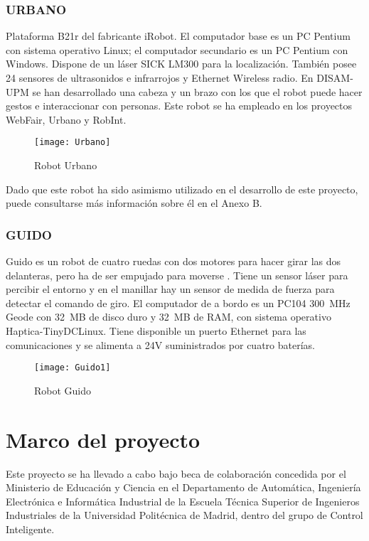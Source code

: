 \subsubsection{URBANO}\label{Urbano}
Plataforma B21r del fabricante iRobot. El computador base es un PC Pentium con sistema operativo Linux; el computador secundario es un PC Pentium con Windows. Dispone de un láser SICK LM300 para la localización. También posee 24 sensores de ultrasonidos e infrarrojos y Ethernet Wireless radio. En DISAM-UPM se han desarrollado una cabeza y un brazo con los que el robot puede hacer gestos e interaccionar con personas. Este robot se ha empleado en los proyectos WebFair, Urbano y RobInt.

\begin{figure}[h]
  \centering\texttt{[image: Urbano]}\\
  \caption{Robot Urbano}\label{fg:b21r}
\end{figure}

Dado que este robot ha sido asimismo utilizado en el desarrollo de este proyecto, puede consultarse más información sobre él en el Anexo B.

\subsubsection{GUIDO}
Guido es un robot de cuatro ruedas con dos motores para hacer girar las dos delanteras, pero ha de ser empujado para moverse \cite{Rodriguez-Losada05}. Tiene un sensor láser para percibir el entorno y en el manillar hay un sensor de medida de fuerza para detectar el comando de giro. El computador de a bordo es un PC104 300~MHz Geode con 32~MB de disco duro y 32~MB de RAM, con sistema operativo Haptica-TinyDCLinux. Tiene disponible un puerto Ethernet para las comunicaciones y se alimenta a 24V suministrados por cuatro baterías.

\begin{figure}[h]
  \centering\texttt{[image: Guido1]}\\
  \caption{Robot Guido}\label{fg:guido}
\end{figure}


\section{Marco del proyecto}
Este proyecto se ha llevado a cabo bajo beca de colaboración concedida por el Ministerio de Educación y Ciencia en el Departamento de Automática, Ingeniería Electrónica e Informática Industrial de la Escuela Técnica Superior de Ingenieros Industriales de la Universidad Politécnica de Madrid, dentro del grupo de Control Inteligente.

